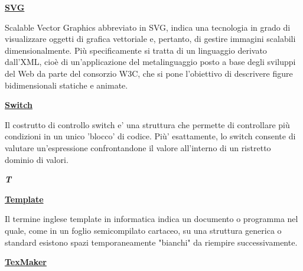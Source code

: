 \bigskip
\begin{addmargin}[0em]{0em}		
	\textbf{\underline{SVG}}
	\end{addmargin} 
	
\medskip
\begin{addmargin}[5em]{1em}	
Scalable Vector Graphics abbreviato in SVG, indica una tecnologia in grado di visualizzare oggetti di grafica vettoriale e, pertanto, di gestire immagini scalabili dimensionalmente.
Più specificamente si tratta di un linguaggio derivato dall'XML, cioè di un'applicazione del metalinguaggio posto a base degli sviluppi del Web da parte del consorzio W3C, che si pone l'obiettivo di descrivere figure bidimensionali statiche e animate.
\end{addmargin}	

\bigskip
\begin{addmargin}[0em]{0em}		
	\textbf{\underline{Switch}}
	\end{addmargin} 
	
\medskip
\begin{addmargin}[5em]{1em}	
Il costrutto di controllo switch e' una struttura che permette di controllare più condizioni in un unico 'blocco' di codice. Più' esattamente, lo switch consente di valutare un'espressione confrontandone il valore all'interno di un ristretto dominio di valori.
\end{addmargin}	

\newpage
	
\cleardoublepage
{}
{}
\noindent\hrulefill\hspace{4mm}\textbf{\textsl{\Huge{T}}}\hspace{4mm}\hrulefill

\vspace*{2\bigskipamount}	

\begin{addmargin}[0em]{0em}		
	\textbf{\underline{Template}}
	\end{addmargin}
	 
\medskip
\begin{addmargin}[5em]{1em}	
Il termine inglese template in informatica indica un documento o programma nel quale, come in un foglio semicompilato cartaceo, su una struttura generica o standard esistono spazi temporaneamente "bianchi" da riempire successivamente.
\end{addmargin}

\bigskip
\begin{addmargin}[0em]{0em}		
	\textbf{\underline{TexMaker}}
\end{addmargin} 
	
